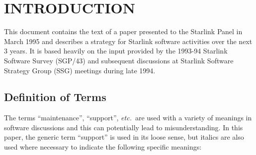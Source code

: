 \documentclass[twoside,11pt]{article}
\newcommand{\stardocinitials}  {SGP}
\newcommand{\stardocnumber}    {42.1}
\newcommand{\stardocname}{\stardocinitials /\stardocnumber}
\newcommand{\htmladdimg}[1]{}
\newenvironment{latexonly}{}{}
\newcommand{\htmlref}[2]{#1}
\newcommand{\htmladdtonavigation}[1]{}
\newcommand{\qt}[1]{``#1''}
\newcommand{\st}[1]{{\em{#1}}}
\newcommand{\qt}[1]{{\tt{"}}#1{\tt{"}}}
\begin{document}

\begin{latexonly}
   \setlength{\parskip}{0mm}
   \tableofcontents
   \setlength{\parskip}{\medskipamount}
   \markright{\stardocname}
\end{latexonly}


\section{INTRODUCTION}

This document contains the text of a paper presented to the Starlink
Panel in March 1995 and describes a strategy for Starlink software
activities over the next 3 years. It is based heavily on the input
provided by the 1993-94 Starlink Software Survey (SGP/43) 
and subsequent discussions at Starlink Software Strategy Group
(SSG) meetings during late 1994.

\subsection{Definition of Terms}

The terms \qt{maintenance}, \qt{support}, \st{etc.}\ are used with a
variety of meanings in software discussions and this can potentially
lead to misunderstanding. In this paper, the generic term \qt{support}
is used in its loose sense, but italics are also used where necessary
to indicate the following specific meanings:
\end{document}
